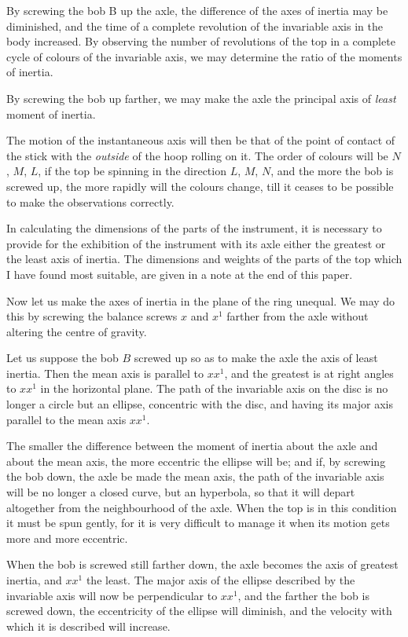 \documentclass[12pt]{article}
\begin{document}
By screwing the bob B up the axle, the difference of the axes of
inertia may be diminished, and the time of a complete revolution of
the invariable axis in the body increased.  By observing the number of
revolutions of the top in a complete cycle of colours of the
invariable axis, we may determine the ratio of the moments of inertia.

By screwing the bob up farther, we may make the axle the principal
axis of \emph{least} moment of inertia.

The motion of the instantaneous axis will then be that of the point of
contact of the stick with the \emph{outside} of the hoop rolling on
it.  The order of colours will be $N$, $M$, $L$, if the top be
spinning in the direction $L$, $M$, $N$, and the more the bob is
screwed up, the more rapidly will the colours change, till it ceases
to be possible to make the observations correctly.

In calculating the dimensions of the parts of the instrument, it is
necessary to provide for the exhibition of the instrument with its
axle either the greatest or the least axis of inertia.  The dimensions
and weights of the parts of the top which I have found most suitable,
are given in a note at the end of this paper.

Now let us make the axes of inertia in the plane of the ring unequal.
We may do this by screwing the balance screws $x$ and $x^1$ farther
from the axle without altering the centre of gravity.

Let us suppose the bob $B$ screwed up so as to make the axle the axis
of least inertia.  Then the mean axis is parallel to $xx^1$, and the
greatest is at right angles to $xx^1$ in the horizontal plane.  The
path of the invariable axis on the disc is no longer a circle but an
ellipse, concentric with the disc, and having its major axis parallel
to the mean axis $xx^1$.

The smaller the difference between the moment of inertia about the
axle and about the mean axis, the more eccentric the ellipse will be;
and if, by screwing the bob down, the axle be made the mean axis, the
path of the invariable axis will be no longer a closed curve, but an
hyperbola, so that it will depart altogether from the neighbourhood of
the axle.  When the top is in this condition it must be spun gently,
for it is very difficult to manage it when its motion gets more and
more eccentric.

When the bob is screwed still farther down, the axle becomes the axis
of greatest inertia, and $xx^1$ the least.  The major axis of the
ellipse described by the invariable axis will now be perpendicular to
$xx^1$, and the farther the bob is screwed down, the eccentricity of
the ellipse will diminish, and the velocity with which it is described
will increase.
\end{document}
